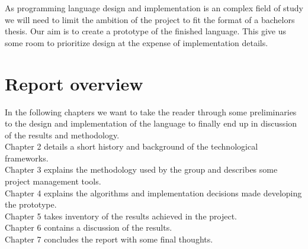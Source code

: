 As programming language design and implementation is an complex field of study we will need to limit the ambition of the project to fit the format of a bachelors thesis. Our aim is to create a prototype of the finished language. This give us some room to prioritize design at the expense of implementation details.  

\section{Report overview}

In the following chapters we want to take the reader through some preliminaries to the design and implementation of the language to finally end up in discussion of the results and methodology.\\
Chapter 2 details a short history and background of the technological frameworks. \\
Chapter 3 explains the methodology used by the group and describes some project management tools. \\
Chapter 4 explains the algorithms and implementation decisions made developing the prototype. \\
Chapter 5 takes inventory of the results achieved in the project. \\
Chapter 6 contains a discussion of the results. \\
Chapter 7 concludes the report with some final thoughts.
